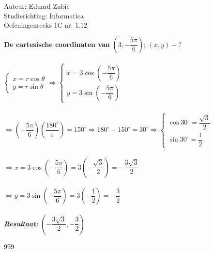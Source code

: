 \documentclass[a4paper]{article}
\begin{document}
  
\noindent \large Auteur: Eduard Zubic \\
\noindent \large Studierichting: Informatica\\
\noindent \large Oefeningenreeks 1C nr. 1.12\\

\medskip

\normalsize

\textbf{De cartesische coordinaten van} $\left(3, -\dfrac{5\pi}{6}\right)$; $(x, y) - ?$ \\\\

$\left \{\begin{array}{l} x = r\cos\theta \\ y = r\sin\theta \end{array}\right. \Rightarrow \left \{\begin{array}{l} x = 3\cos\left(-\dfrac{5\pi}{6}\right) \\ y = 3\sin\left(-\dfrac{5\pi}{6}\right) \end{array}\right.$ \\\\

$\Rightarrow \left(-\dfrac{5\pi}{6}\right)\left(\dfrac{180^\circ}{\pi}\right) = 150^\circ \Rightarrow 180^\circ - 150^\circ = 30^\circ \Rightarrow \left \{\begin{array}{l} \cos30^\circ = \dfrac{\sqrt{3}}{2} \\ \sin30^\circ = \dfrac{1}{2} \end{array}\right.$\\\\

$\Rightarrow x = 3\cos\left(-\dfrac{5\pi}{6}\right) = 3\left(-\dfrac{\sqrt{3}}{2}\right) = -\dfrac{3\sqrt{3}}{2}$\\\\

$\Rightarrow y = 3\sin\left(-\dfrac{5\pi}{6}\right) = 3\left(-\dfrac{1}{2}\right) = -\dfrac{3}{2}$\\\\

\textit{\textbf{Resultaat:}} $\left(-\dfrac{3\sqrt{3}}{2}, -\dfrac{3}{2}\right)$




\begin{thebibliography}{999} 
\end{thebibliography}
\end{document}
